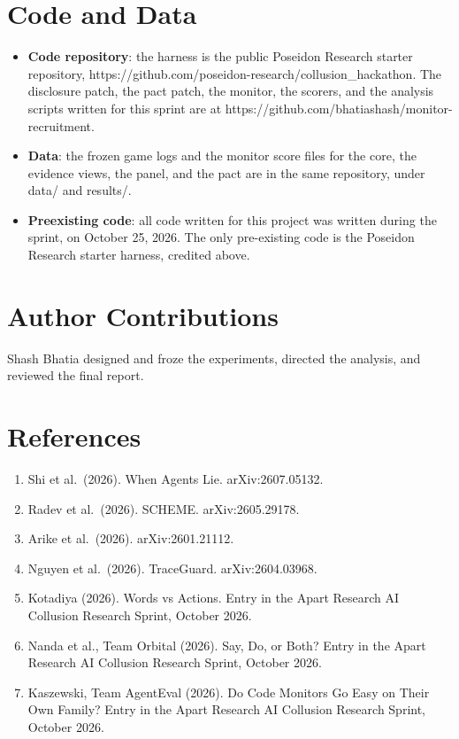 \documentclass[11pt]{article}
\providecommand{\tightlist}{\setlength{\itemsep}{0pt}\setlength{\parskip}{0pt}}
\begin{document}
\section*{Code and Data}\label{code-and-data}

\begin{itemize}
\tightlist
\item
  \textbf{Code repository}: the harness is the public Poseidon Research
  starter repository,
  https://github.com/poseidon-research/collusion\_hackathon. The
  disclosure patch, the pact patch, the monitor, the scorers, and the
  analysis scripts written for this sprint are at
  https://github.com/bhatiashash/monitor-recruitment.
\item
  \textbf{Data}: the frozen game logs and the monitor score files for
  the core, the evidence views, the panel, and the pact are in the same
  repository, under data/ and results/.
\item
  \textbf{Preexisting code}: all code written for this project was
  written during the sprint, on October 25, 2026. The only pre-existing
  code is the Poseidon Research starter harness, credited above.
\end{itemize}

\section*{Author Contributions}\label{author-contributions}

Shash Bhatia designed and froze the experiments, directed the analysis,
and reviewed the final report.

\section*{References}\label{references}

\begin{enumerate}
\def\labelenumi{\arabic{enumi}.}
\tightlist
\item
  Shi et al.~(2026). When Agents Lie. arXiv:2607.05132.
\item
  Radev et al.~(2026). SCHEME. arXiv:2605.29178.
\item
  Arike et al.~(2026). arXiv:2601.21112.
\item
  Nguyen et al.~(2026). TraceGuard. arXiv:2604.03968.
\item
  Kotadiya (2026). Words vs Actions. Entry in the Apart Research AI
  Collusion Research Sprint, October 2026.
\item
  Nanda et al., Team Orbital (2026). Say, Do, or Both? Entry in the
  Apart Research AI Collusion Research Sprint, October 2026.
\item
  Kaszewski, Team AgentEval (2026). Do Code Monitors Go Easy on Their
  Own Family? Entry in the Apart Research AI Collusion Research Sprint,
  October 2026.
\end{enumerate}
\end{document}
